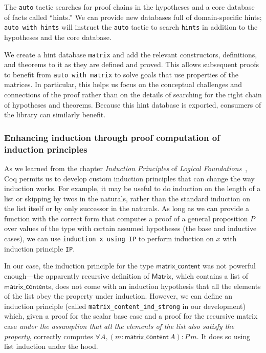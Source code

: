 \documentclass[11pt,conference]{IEEEtran}
\newcommand{\func}[1]{\mathsf{#1}}
\theoremstyle{plain} %
\theoremstyle{definition}
\theoremstyle{remark}
\begin{document}
The \texttt{auto} tactic searches for proof chains in the hypotheses and a core
database of facts called ``hints.'' We can provide new databases full of
domain-specific hints; \texttt{auto with hints} will instruct the \texttt{auto}
tactic to search \texttt{hints} in addition to the hypotheses and the core
database.

We create a hint database \texttt{matrix} and add the relevant constructors,
definitions, and theorems to it as they are defined and proved. This allows
subsequent proofs to benefit from \texttt{auto with matrix} to solve goals that
use properties of the matrices. In particular, this helps us focus on the
conceptual challenges and connections of the proof rather than on the details of
searching for the right chain of hypotheses and theorems. Because this hint
database is exported, consumers of the library can similarly benefit.

\subsubsection{Enhancing induction through proof computation of induction
principles}\label{S:coq_ind}

As we learned from the chapter \textit{Induction Principles} of \textit{Logical
Foundations}~\cite{Pierce:SF1}, Coq permits us to develop custom induction
principles that can change the way induction works. For example, it may be
useful to do induction on the length of a list or skipping by twos in the
naturals, rather than the standard induction on the list itself or by only
successor in the naturals. As long as we can provide a function with the correct
form that computes a proof of a general proposition \(P\) over values of the
type with certain assumed hypotheses (the base and inductive cases), we can use
\texttt{induction x using IP} to perform induction on \(x\) with
induction principle \texttt{IP}.

In our case, the induction principle for the type \(\func{matrix\_content}\) was
not powerful enough---the apparently recursive definition of \(\func{Matrix}\),
which contains a list of \(\func{matrix\_content}\)s, does not come with an
induction hypothesis that all the elements of the list obey the property under
induction. However, we can define an induction principle (called
\texttt{matrix\_content\_ind\_strong} in our development) which, given a proof
for the scalar base case and a proof for the recursive matrix case \emph{under
the assumption that all the elements of the list also satisfy the property},
correctly computes \(\forall A, (m: \func{matrix\_content}\, A) : P\, m\). It does
so using list induction under the hood.
\end{document}
